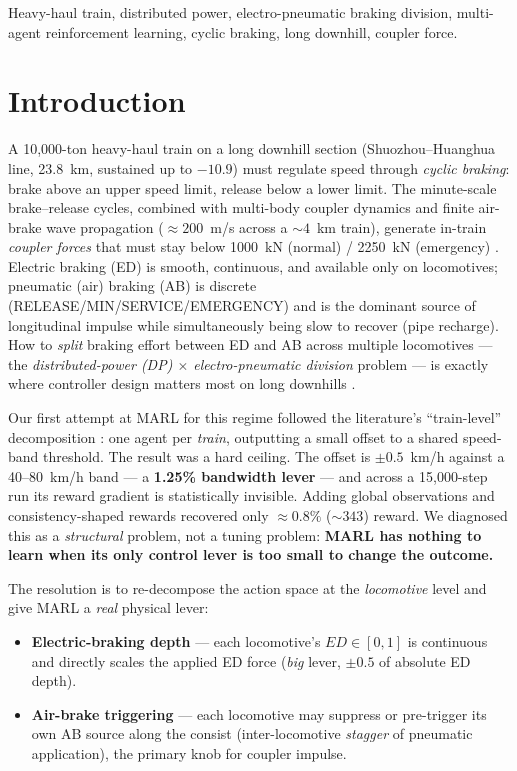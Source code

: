 \documentclass[conference]{IEEEtran}
\newcommand{\permille}{\textperthousand}
\begin{document}
\begin{IEEEkeywords}
Heavy-haul train, distributed power, electro-pneumatic braking division,
multi-agent reinforcement learning, cyclic braking, long downhill, coupler
force.
\end{IEEEkeywords}

\section{Introduction}
\label{sec:intro}

A 10{,}000-ton heavy-haul train on a long downhill section (Shuozhou--Huanghua
line, 23.8~km, sustained up to $-10.9$\permille) must regulate speed through
\emph{cyclic braking}: brake above an upper speed limit, release below a lower
limit. The minute-scale brake--release cycles, combined with multi-body coupler
dynamics and finite air-brake wave propagation ($\approx 200$~m/s across a
$\sim 4$~km train), generate in-train \emph{coupler forces} that must stay
below 1000~kN (normal) / 2250~kN (emergency) \cite{fu2019}. Electric braking
(ED) is smooth, continuous, and available only on locomotives; pneumatic (air)
braking (AB) is discrete (RELEASE/MIN/SERVICE/EMERGENCY) and is the dominant
source of longitudinal impulse while simultaneously being slow to recover (pipe
recharge). How to \emph{split} braking effort between ED and AB across multiple
locomotives --- the \emph{distributed-power (DP) $\times$ electro-pneumatic
division} problem --- is exactly where controller design matters most on long
downhills \cite{tang2020,zhao2022}.

Our first attempt at MARL for this regime followed the literature's
``train-level'' decomposition \cite{liu2025}: one agent per \emph{train},
outputting a small offset to a shared speed-band threshold. The result was a
hard ceiling. The offset is $\pm 0.5$~km/h against a 40--80~km/h band --- a
\textbf{1.25\% bandwidth lever} --- and across a 15{,}000-step run its reward
gradient is statistically invisible. Adding global observations and
consistency-shaped rewards recovered only $\approx 0.8\%$ ($\sim 343$) reward.
We diagnosed this as a \emph{structural} problem, not a tuning problem:
\textbf{MARL has nothing to learn when its only control lever is too small to
change the outcome.}

The resolution is to re-decompose the action space at the \emph{locomotive}
level and give MARL a \emph{real} physical lever:
\begin{itemize}
\item \textbf{Electric-braking depth} --- each locomotive's $ED\in[0,1]$ is
continuous and directly scales the applied ED force (\emph{big} lever, $\pm 0.5$
of absolute ED depth).
\item \textbf{Air-brake triggering} --- each locomotive may suppress or
pre-trigger its own AB source along the consist (inter-locomotive
\emph{stagger} of pneumatic application), the primary knob for coupler impulse.
\end{itemize}
\end{document}
